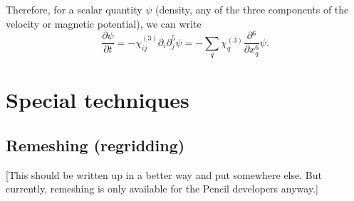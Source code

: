 \documentclass[\mydriver,12pt,twoside,notitlepage,a4paper]{article}
\newcommand{\pderiv}[2]{\frac{\partial #1}{\partial #2}}
\begin{document}
Therefore, for a scalar quantity $\psi$ (density, any of the three components
of the velocity or magnetic potential), we can write
\begin{equation}
  \label{eq:component-6th}
  \pderiv{\psi}{t}
  = - \chi_{ij}^{(3)} {\partial{}}_i{\partial{}}_j^5\psi
  = -\sum_{q}^{} {\chi_q^{(3)} \frac{\partial{}^6}{\partial{x_q^6}}\psi}.
\end{equation}



\section{Special techniques}
\label{S-techinques}


\subsection{Remeshing (regridding)}
\label{S-remesh}
[This should be written up in a better way and put somewhere else.
But currently, remeshing is only available for the Pencil developers
anyway.]
\end{document}
